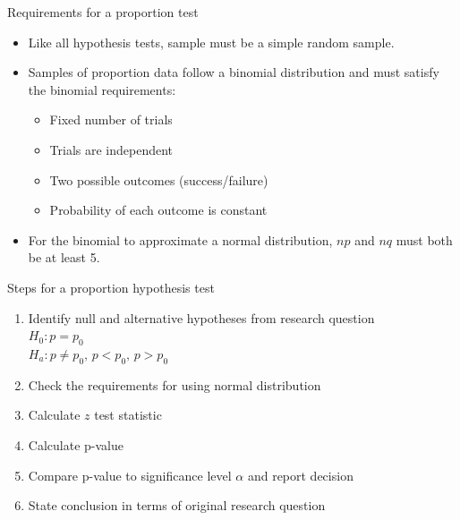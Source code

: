 \documentclass[xcolor=table]{beamer}
\begin{document}
\begin{frame}{Requirements for a proportion test}
\begin{block}{}
\large
\begin{itemize}
\item Like all hypothesis tests, sample must be a simple random sample.\\
\item Samples of proportion data follow a binomial distribution and must satisfy the binomial requirements:
\begin{itemize}
\item Fixed number of trials
\item Trials are independent
\item Two possible outcomes (success/failure)
\item Probability of each outcome is constant
\end{itemize}
\item For the binomial to approximate a normal distribution, $np$ and $nq$ must both be at least 5.
\end{itemize}
\end{block}
\end{frame}

\begin{frame}{Steps for a proportion hypothesis test}
\begin{block}{}
\large
\begin{enumerate}
\item Identify null and alternative hypotheses from research question\\
$H_0: p = p_0$\\
$H_a: p \ne p_0, \, p < p_0, \, p> p_0$
\item Check the requirements for using normal distribution
\item Calculate $z$ test statistic
\item Calculate p-value
\item Compare p-value to significance level $\alpha$ and report decision
\item State conclusion in terms of original research question
\end{enumerate}
\end{block}
\end{frame}
\end{document}
